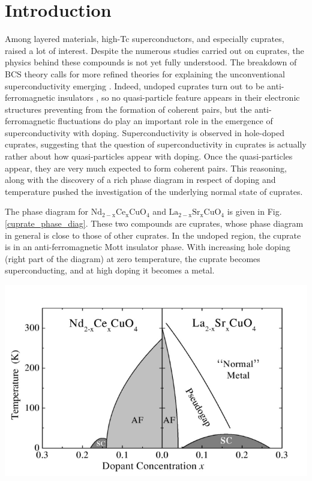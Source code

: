 \documentclass[12pt]{article}
\begin{document}
\section{Introduction}
\begin{multicols}{2}
Among layered materials, high-Tc superconductors, and especially cuprates, 
raised a lot of interest. Despite the numerous studies carried out on cuprates, 
the physics behind these compounds is not yet fully understood. The breakdown of 
BCS theory calls for more refined theories for explaining the unconventional 
superconductivity emerging \cite{Scalapino-rev}. Indeed, undoped cuprates turn 
out to be anti-ferromagnetic insulators \cite{damscelli-cuprates-review}, so no 
quasi-particle feature appears in their electronic structures preventing from 
the formation of coherent pairs, but the anti-ferromagnetic fluctuations do play 
an important role in the emergence of superconductivity with doping. 
Superconductivity is observed in hole-doped cuprates, suggesting that the 
question of superconductivity in cuprates is actually rather about how 
quasi-particles appear with doping. Once the quasi-particles appear, they are 
very much expected to form coherent pairs. This reasoning, along with the 
discovery of a rich phase diagram in respect of doping and temperature pushed 
the investigation of the underlying normal state of cuprates. \par The phase 
diagram for $\mathrm{Nd_{2-x}Ce_{x}CuO_{4}}$ and 
$\mathrm{La_{2-x}Sr_{x}CuO_{4}}$ \cite{damscelli-cuprates-review} is given in 
Fig. \ref{cuprate_phase_diag}. These two compounds are cuprates, whose phase 
diagram in general is close to those of other cuprates. In the undoped region, 
the cuprate is in an anti-ferromagnetic Mott insulator phase. With increasing 
hole doping (right part of the diagram) at zero temperature, the cuprate becomes 
superconducting, and at high doping it becomes a metal.
\begin{center}
    \includegraphics[width=\linewidth]{cuprates-PhaseDiag.png}

\end{center}
\end{multicols}
\end{document}
